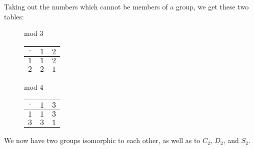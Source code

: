 \documentclass[../gatm.tex]{subfiles}
\begin{document}
\noindent Taking out the numbers which cannot be members of a group, we get these two tables:

\begin{figure}[h]
	\begin{center}
		\begin{minipage}[t]{0.45\textwidth}
			\centering
			mod $3$ \\
			\vspace*{\baselineskip}
			\begin{tabular}{c|cc}
				\hline
				$\cdot$ & $1$ & $2$ \\ \hline
				\rowcolor{light-gray}
				$1$ & $1$ & $2$ \\
				$2$ & $2$ & $1$ \\ \hline
			\end{tabular}
		\end{minipage}
		\hfill
		\begin{minipage}[t]{0.45\textwidth}
			\centering
			mod $4$ \\
			\vspace*{\baselineskip}
			\begin{tabular}{c|cc}
				\hline
				$\cdot$ & $1$ & $3$ \\ \hline
				\rowcolor{light-gray}
				$1$ & $1$ & $3$ \\
				$3$ & $3$ & $1$ \\ \hline
			\end{tabular}
		\end{minipage}
	\end{center}
\end{figure}

\noindent We now have two groups isomorphic to each other, as well as to $C_2$, $D_2$, and $S_2$.
\end{document}
